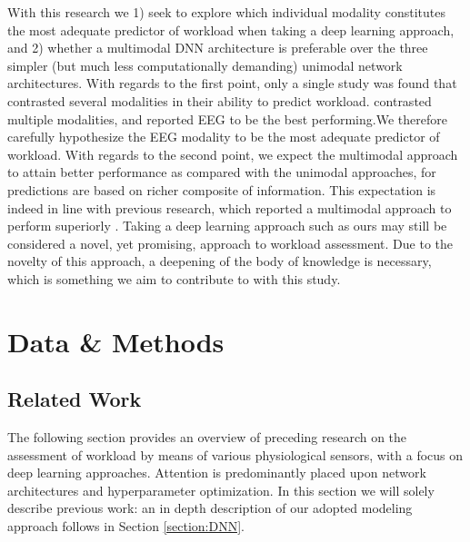 \documentclass[fleqn,11pt]{paper}
\begin{document}
With this research we 1) seek to explore which individual modality constitutes the most adequate predictor of workload when taking a deep learning approach, and 2) whether a multimodal DNN architecture is preferable over the three simpler (but much less computationally demanding) unimodal network architectures. With regards to the first point, only a single study was found that contrasted several modalities in their ability to predict workload.  contrasted multiple modalities, and reported EEG to be the best performing.We therefore carefully hypothesize the EEG modality to be the most adequate predictor of workload. With regards to the second point, we expect the multimodal approach to attain better performance as compared with the unimodal approaches, for predictions are based on richer composite of information. This expectation is indeed in line with previous research, which reported a multimodal approach to perform superiorly \cite{dolmans2020perceived, han2020classification,rastgoo2019automatic, yin2017recognition}. Taking a deep learning approach such as ours may still be considered a novel, yet promising, approach to workload assessment. Due to the novelty of this approach, a deepening of the body of knowledge is necessary, which is something we aim to contribute to with this study.

\vspace{10mm}
\section{Data \& Methods}
\subsection{Related Work} \label{sec:related}
The following section provides an overview of preceding research on the assessment of workload by means of various physiological sensors, with a focus on deep learning approaches. Attention is predominantly placed upon network architectures and hyperparameter optimization. In this section we will solely describe previous work: an in depth description of our adopted modeling approach follows in Section \ref{section:DNN}.
\end{document}
